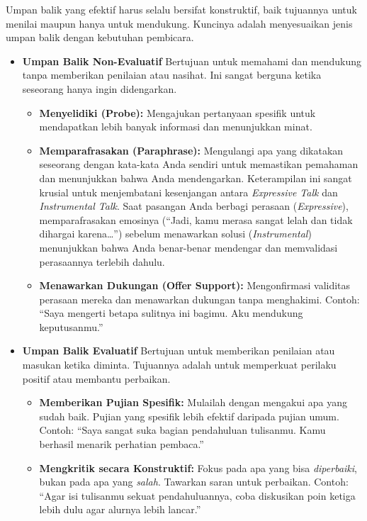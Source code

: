 \documentclass[
  letterpaper,
  DIV=11,
  numbers=noendperiod]{scrreprt}
\providecommand{\tightlist}{%
  \setlength{\itemsep}{0pt}\setlength{\parskip}{0pt}}
\begin{document}
Umpan balik yang efektif harus selalu bersifat konstruktif, baik
tujuannya untuk menilai maupun hanya untuk mendukung. Kuncinya adalah
menyesuaikan jenis umpan balik dengan kebutuhan pembicara.

\begin{itemize}
\tightlist
\item
  \textbf{Umpan Balik Non-Evaluatif} Bertujuan untuk memahami dan
  mendukung tanpa memberikan penilaian atau nasihat. Ini sangat berguna
  ketika seseorang hanya ingin didengarkan.

  \begin{itemize}
  \tightlist
  \item
    \textbf{Menyelidiki (Probe):} Mengajukan pertanyaan spesifik untuk
    mendapatkan lebih banyak informasi dan menunjukkan minat.
  \item
    \textbf{Memparafrasakan (Paraphrase):} Mengulangi apa yang dikatakan
    seseorang dengan kata-kata Anda sendiri untuk memastikan pemahaman
    dan menunjukkan bahwa Anda mendengarkan. Keterampilan ini sangat
    krusial untuk menjembatani kesenjangan antara \emph{Expressive Talk}
    dan \emph{Instrumental Talk}. Saat pasangan Anda berbagi perasaan
    (\emph{Expressive}), memparafrasakan emosinya (``Jadi, kamu merasa
    sangat lelah dan tidak dihargai karena\ldots{}'') sebelum menawarkan
    solusi (\emph{Instrumental}) menunjukkan bahwa Anda benar-benar
    mendengar dan memvalidasi perasaannya terlebih dahulu.
  \item
    \textbf{Menawarkan Dukungan (Offer Support):} Mengonfirmasi
    validitas perasaan mereka dan menawarkan dukungan tanpa menghakimi.
    Contoh: ``Saya mengerti betapa sulitnya ini bagimu. Aku mendukung
    keputusanmu.''
  \end{itemize}
\item
  \textbf{Umpan Balik Evaluatif} Bertujuan untuk memberikan penilaian
  atau masukan ketika diminta. Tujuannya adalah untuk memperkuat
  perilaku positif atau membantu perbaikan.

  \begin{itemize}
  \tightlist
  \item
    \textbf{Memberikan Pujian Spesifik:} Mulailah dengan mengakui apa
    yang sudah baik. Pujian yang spesifik lebih efektif daripada pujian
    umum. Contoh: ``Saya sangat suka bagian pendahuluan tulisanmu. Kamu
    berhasil menarik perhatian pembaca.''
  \item
    \textbf{Mengkritik secara Konstruktif:} Fokus pada apa yang bisa
    \emph{diperbaiki}, bukan pada apa yang \emph{salah}. Tawarkan saran
    untuk perbaikan. Contoh: ``Agar isi tulisanmu sekuat pendahuluannya,
    coba diskusikan poin ketiga lebih dulu agar alurnya lebih lancar.''
  \end{itemize}
\end{itemize}
\end{document}
